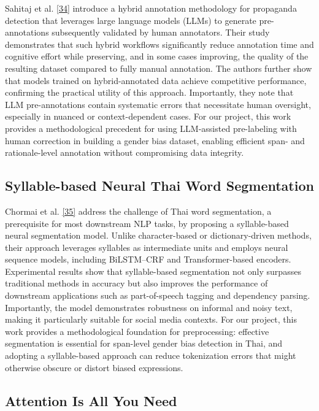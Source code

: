 \documentclass[12pt,oneside,openright,a4paper]{cpe-english-project}
\begin{document}
Sahitaj et al. \hyperlink{bib:ref34}{[34]} introduce a hybrid annotation methodology for propaganda detection that leverages large language models (LLMs) to generate pre-annotations subsequently validated by human annotators. Their study demonstrates that such hybrid workflows significantly reduce annotation time and cognitive effort while preserving, and in some cases improving, the quality of the resulting dataset compared to fully manual annotation. The authors further show that models trained on hybrid-annotated data achieve competitive performance, confirming the practical utility of this approach. Importantly, they note that LLM pre-annotations contain systematic errors that necessitate human oversight, especially in nuanced or context-dependent cases. For our project, this work provides a methodological precedent for using LLM-assisted pre-labeling with human correction in building a gender bias dataset, enabling efficient span- and rationale-level annotation without compromising data integrity.

\subsection{Syllable-based Neural Thai Word Segmentation}

Chormai et al. \hyperlink{bib:ref35}{[35]} address the challenge of Thai word segmentation, a prerequisite for most downstream NLP tasks, by proposing a syllable-based neural segmentation model. Unlike character-based or dictionary-driven methods, their approach leverages syllables as intermediate units and employs neural sequence models, including BiLSTM--CRF and Transformer-based encoders. Experimental results show that syllable-based segmentation not only surpasses traditional methods in accuracy but also improves the performance of downstream applications such as part-of-speech tagging and dependency parsing. Importantly, the model demonstrates robustness on informal and noisy text, making it particularly suitable for social media contexts. For our project, this work provides a methodological foundation for preprocessing: effective segmentation is essential for span-level gender bias detection in Thai, and adopting a syllable-based approach can reduce tokenization errors that might otherwise obscure or distort biased expressions.

\subsection{Attention Is All You Need}
\end{document}
